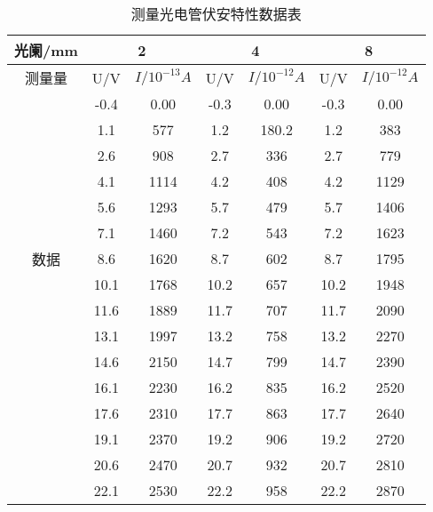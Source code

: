 \documentclass{article}
\begin{document}
\begin{table}[]
\centering
\caption{测量光电管伏安特性数据表}
\label{tab:table2}
\begin{tabular}{@{}c|cc|cc|cc@{}}
\toprule
光阑/mm                & \multicolumn{2}{c|}{2} & \multicolumn{2}{c|}{4} & \multicolumn{2}{c}{8} \\ \midrule
测量量                  & U/V   & $I/10^{-13}A$ & U/V   & $I/10^{-12}A$  & U/V   & $I/10^{-12}A$  \\ \midrule
\multirow{13}{*}{数据} & -0.4  & 0.00          & -0.3  & 0.00           & -0.3  & 0.00           \\
                     & 1.1   & 577           & 1.2   & 180.2          & 1.2   & 383            \\
                     & 2.6   & 908           & 2.7   & 336            & 2.7   & 779            \\
                     & 4.1   & 1114          & 4.2   & 408            & 4.2   & 1129           \\
                     & 5.6   & 1293          & 5.7   & 479            & 5.7   & 1406           \\
                     & 7.1   & 1460          & 7.2   & 543            & 7.2   & 1623           \\
                     & 8.6   & 1620          & 8.7   & 602            & 8.7   & 1795           \\
                     & 10.1  & 1768          & 10.2  & 657            & 10.2  & 1948           \\
                     & 11.6  & 1889          & 11.7  & 707            & 11.7  & 2090           \\
                     & 13.1  & 1997          & 13.2  & 758            & 13.2  & 2270           \\
                     & 14.6  & 2150          & 14.7  & 799            & 14.7  & 2390           \\
                     & 16.1  & 2230          & 16.2  & 835            & 16.2  & 2520           \\
                     & 17.6  & 2310          & 17.7  & 863            & 17.7  & 2640           \\
                     & 19.1  & 2370          & 19.2  & 906            & 19.2  & 2720           \\
                     & 20.6  & 2470          & 20.7  & 932            & 20.7  & 2810           \\
                     & 22.1  & 2530          & 22.2  & 958            & 22.2  & 2870           \\

\end{tabular}
\end{table}
\end{document}
